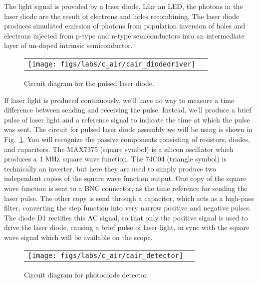 The light signal is provided by a laser diode.  Like an
LED, the photons in the laser diode are the result of electrons and
holes recombining.  The laser diode produces simulated emission of
photons from population inversion of holes and electrons injected from
p-type and n-type semiconductors into an intermediate layer of
un-doped intrinsic semiconductor.  

\begin{figure}[htbp]
\begin{center}
\begin{tabular}{cc}
\texttt{[image: figs/labs/c\_air/cair\_diodedriver]}
\end{tabular}
\end{center}
\caption{\label{fig:clasercirc} Circuit diagram for the pulsed laser diode.}
\end{figure}

If laser light is produced continuously, we'll have no way to measure
a time difference between sending and receiving the pulse.  Instead,
we'll produce a brief pulse of laser light and a reference signal to
indicate the time at which the pulse was sent.  The circuit for pulsed
laser diode assembly we will be using is shown in
Fig.~\ref{fig:clasercirc}.  You will recognize the passive components
consisting of resistors, diodes, and capacitors.  The MAX7375 (square
symbol) is a silicon oscillator which produces a $1~\rm MHz$ square
wave function.  The 74C04 (triangle symbol) is technically an
inverter, but here they are used to simply produce two independent
copies of the square wave function output.  One copy of the square
wave function is sent to a BNC connector, as the time reference for
sending the laser pulse.  The other copy is send through a capacitor,
which acts as a high-pass filter, converting the step function into
very narrow positive and negative pulses.  The diode D1 rectifies this
AC signal, so that only the positive signal is used to drive the laser
diode, causing a brief pulse of laser light, in sync with the square
wave signal which will be available on the scope.

\begin{figure}[htbp]
\begin{center}
\begin{tabular}{cc}
\texttt{[image: figs/labs/c\_air/cair\_detector]}
\end{tabular}
\end{center}
\caption{\label{fig:cdetectorcirc} Circuit diagram for photodiode detector.}
\end{figure}

